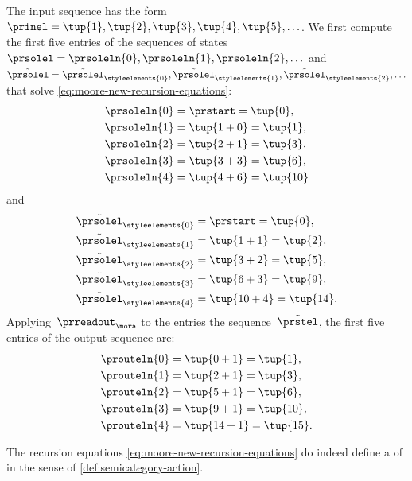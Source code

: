 {\begin{example}
    The input sequence has the form~$\prinel = \tup{1}, \tup{2}, \tup{3}, \tup{4}, \tup{5}, \ldots$.
    We first compute the first five entries of the sequences of states~$\prsolel = \prsoleln{0}, \prsoleln{1}, \prsoleln{2}, \ldots$ and~$\tilde{\prsolel} = \tilde{\prsolel}_\styleelements{0}, \tilde{\prsolel}_\styleelements{1}, \tilde{\prsolel}_\styleelements{2}, \ldots$ that solve \cref{eq:moore-new-recursion-equations}:
    \begin{align}\label{eq:moore-action-example-calc-1}
        \prsoleln{0} & = \prstart = \tup{0}, \\
        \prsoleln{1} & = \tup{1 + 0} = \tup{1}, \\
        \prsoleln{2} & = \tup{2 + 1} = \tup{3}, \\
        \prsoleln{3} & = \tup{3 + 3} = \tup{6}, \\
        \prsoleln{4} & = \tup{4 + 6} = \tup{10}
    \end{align}
    and
    \begin{align}\label{eq:moore-action-example-calc-2}
        \tilde{\prsolel}_\styleelements{0} & = \prstart = \tup{0}, \\
        \tilde{\prsolel}_\styleelements{1} & = \tup{1 + 1} = \tup{2}, \\
        \tilde{\prsolel}_\styleelements{2} & = \tup{3 + 2} = \tup{5}, \\
        \tilde{\prsolel}_\styleelements{3} & = \tup{6 + 3} = \tup{9}, \\
        \tilde{\prsolel}_\styleelements{4} & = \tup{10 + 4} = \tup{14}.
    \end{align}
    Applying~$\prreadout_\mora$ to the entries the sequence~$\tilde \prstel$, the first five entries of the output sequence are:
    \begin{align}\label{eq:moore-action-example-calc-3}
        \prouteln{0} & = \tup{0 + 1} = \tup{1}, \\
        \prouteln{1} & = \tup{2 + 1} = \tup{3}, \\
        \prouteln{2} & = \tup{5 + 1} = \tup{6}, \\
        \prouteln{3} & = \tup{9 + 1} = \tup{10}, \\
        \prouteln{4} & = \tup{14 + 1} = \tup{15}.
    \end{align}
\end{example}


\begin{lemma}\label{lem:moore-new-recursion-equations}
    The recursion equations \cref{eq:moore-new-recursion-equations} do indeed define a  of  in the sense of \cref{def:semicategory-action}.
\end{lemma}

}
